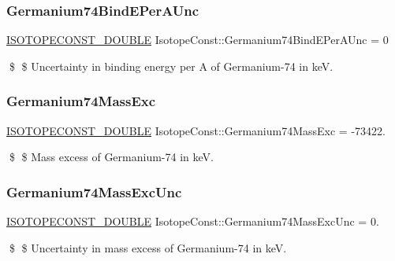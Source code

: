 \subsubsection{\texorpdfstring{Germanium74\+Bind\+E\+Per\+A\+Unc}{Germanium74BindEPerAUnc}}
{\footnotesize\ttfamily \mbox{\hyperlink{group___isotope_const-_macros_ga8f45a7272ce02c0b4c65c44636ed719a}{I\+S\+O\+T\+O\+P\+E\+C\+O\+N\+S\+T\+\_\+\+D\+O\+U\+B\+LE}} Isotope\+Const\+::\+Germanium74\+Bind\+E\+Per\+A\+Unc = 0}

\$ \$ Uncertainty in binding energy per A of Germanium-\/74 in keV. \mbox{\label{group___isotope_const-_germanium-_ge74_ga757abb30ceec5b09669e227812f13282}} 
\subsubsection{\texorpdfstring{Germanium74\+Mass\+Exc}{Germanium74MassExc}}
{\footnotesize\ttfamily \mbox{\hyperlink{group___isotope_const-_macros_ga8f45a7272ce02c0b4c65c44636ed719a}{I\+S\+O\+T\+O\+P\+E\+C\+O\+N\+S\+T\+\_\+\+D\+O\+U\+B\+LE}} Isotope\+Const\+::\+Germanium74\+Mass\+Exc = -\/73422.}

\$ \$ Mass excess of Germanium-\/74 in keV. \mbox{\label{group___isotope_const-_germanium-_ge74_gaa6c4bb380b6423ed9b14de1ba3b30713}} 
\subsubsection{\texorpdfstring{Germanium74\+Mass\+Exc\+Unc}{Germanium74MassExcUnc}}
{\footnotesize\ttfamily \mbox{\hyperlink{group___isotope_const-_macros_ga8f45a7272ce02c0b4c65c44636ed719a}{I\+S\+O\+T\+O\+P\+E\+C\+O\+N\+S\+T\+\_\+\+D\+O\+U\+B\+LE}} Isotope\+Const\+::\+Germanium74\+Mass\+Exc\+Unc = 0.}

\$ \$ Uncertainty in mass excess of Germanium-\/74 in keV. \mbox{\label{group___isotope_const-_germanium-_ge74_gaeefc0dae78d1ca5e595f2c729231a723}} 
